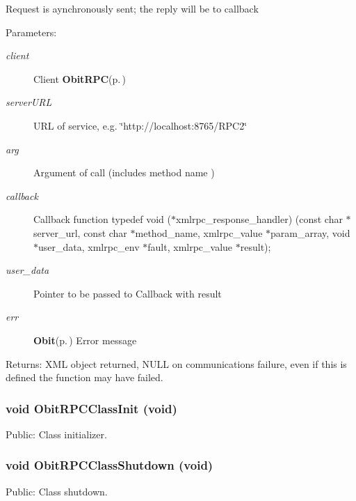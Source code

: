 Request is aynchronously sent; the reply will be to callback \begin{Desc}
\item[Parameters:]
\begin{description}
\item[{\em client}]Client {\bf Obit\-RPC}{\rm (p.\,\pageref{structObitRPC})} \item[{\em server\-URL}]URL of service, e.g. \char`\"{}http://localhost:8765/RPC2\char`\"{} \item[{\em arg}]Argument of call (includes method name ) \item[{\em callback}]Callback function typedef void ($\ast$xmlrpc\_\-response\_\-handler) (const char $\ast$server\_\-url, const char $\ast$method\_\-name, xmlrpc\_\-value $\ast$param\_\-array, void $\ast$user\_\-data, xmlrpc\_\-env $\ast$fault, xmlrpc\_\-value $\ast$result); \item[{\em user\_\-data}]Pointer to be passed to Callback with result \item[{\em err}]{\bf Obit}{\rm (p.\,\pageref{structObit})} Error message \end{description}
\end{Desc}
\begin{Desc}
\item[Returns:]XML object returned, NULL on communications failure, even if this is defined the function may have failed. \end{Desc}
\subsubsection{\setlength{\rightskip}{0pt plus 5cm}void Obit\-RPCClass\-Init (void)}\label{ObitRPC_8h_a14}


Public: Class initializer. 

\subsubsection{\setlength{\rightskip}{0pt plus 5cm}void Obit\-RPCClass\-Shutdown (void)}\label{ObitRPC_8h_a15}


Public: Class shutdown. 

